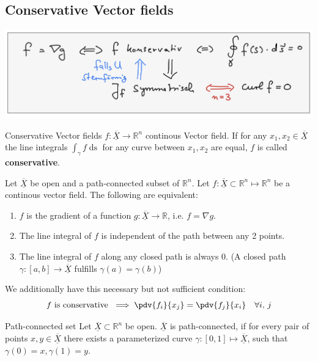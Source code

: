 \documentclass[a4paper,fontsize = 10pt]{article}
\def\R{\mathbb{R}}
\def\X{\underline{\overline{X}}}
\begin{document}
\subsection{Conservative Vector fields}
\includegraphics[width = \linewidth]{Implications_cons.png}

\begin{subbox}{Conservative Vector fields}
    $f: \X \to \R^n$ continous Vector field. If for any $x_1, x_2 \in \X$ the line integrals $\int_{\gamma}f \mathop{ds}$ for any curve between $x_1,x_2$ are equal, $f$ is called \textbf{conservative}.
\end{subbox}

Let \(\X\) be open and a path-connected subset of $\R^n$. Let \(f: \X \subset \R^n \mapsto \R^n\) be a continous vector field. The following are equivalent:
\begin{enumerate}
  \item $f$ is the gradient of a function $g: \X \to \R$, i.e. $f = \nabla g$.
  \item The line integral of $f$ is independent of the path between any 2 points.
  \item The line integral of $f$ along any closed path is always $0$. (A closed path $\gamma: [a, b] \to \X$ fulfills $\gamma(a) =\gamma(b)$)
\end{enumerate}
We additionally have this necessary but not sufficient condition:
\[f \text{ is conservative }\implies \pdv{f_i}{x_j} = \pdv{f_j}{x_i} \quad \forall i,\, j\]

\begin{subbox}{Path-connected set}
  Let \(\X \subset \R^n\) be open. \(\X\) is path-connected, if for every pair of points \(x, y \in \X\) there exists a parameterized curve \(\gamma : \left[0, 1\right] \mapsto \X\), such that \(\gamma(0) = x, \gamma(1) = y\).
\end{subbox}
\end{document}
